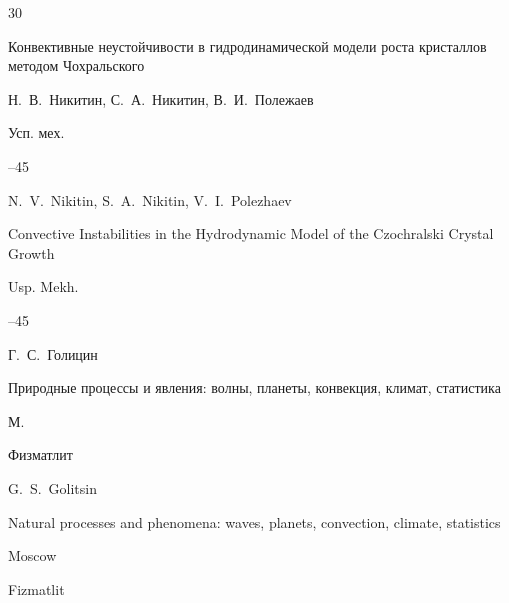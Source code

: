 {\begin{thebibliography}{30}


















\paper Конвективные неустойчивости в гидродинамической модели роста кристаллов методом Чохральского

\by Н.~В.~Никитин, С.~А.~Никитин, В.~И.~Полежаев

\jour Усп. мех.




--45

\misctransl

\by N.~V.~Nikitin, S.~A.~Nikitin, V.~I.~Polezhaev

\paper Convective Instabilities in the Hydrodynamic Model of the Czochralski Crystal Growth

\jour Usp. Mekh. 




--45




\by Г.~С.~Голицин 

\book Природные процессы и явления: волны, планеты, конвекция, климат, статистика 

\publaddr М. 

\publ Физматлит 



\misctransl

\by G.~S.~Golitsin  

\book Natural processes and phenomena: waves, planets, convection, climate, statistics

\publaddr Moscow

\publ Fizmatlit








\end{thebibliography}}
